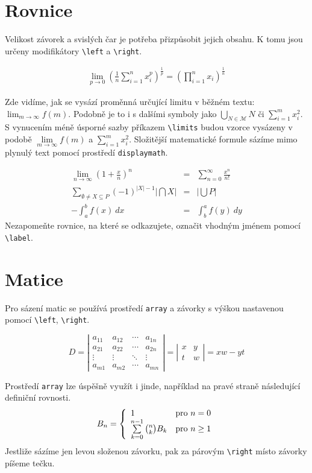 \documentclass[a4paper, 11pt, twocolumn]{article}
\theoremstyle{definition}
\theoremstyle{definition}
\begin{document}
\section{Rovnice}
Velikost závorek a svislých čar je potřeba přizpůsobit jejich obsahu.
K tomu jsou určeny modifikátory \texttt{\textbackslash left} a \texttt{\textbackslash right}.

\begin{eqnarray}
\lim_{p\to 0} \left(\frac{1}{n} \sum\limits _{i=1}^n x_i^p\right)^\frac{1}{p}=\left(\prod\limits _{i=1}^n x_i\right)^\frac{1}{n}
\end{eqnarray}

Zde vidíme, jak se vysází proměnná určující limitu v běžném textu: $\lim_{m\to\infty}f(m)$.
Podobně je to i s dalšími symboly jako $\bigcup_{N\in\mathcal{M}}N$ či $\sum_{i=1}^m x_i^2$.
S vynucením méně úsporné sazby příkazem \texttt{\textbackslash limits} budou vzorce vysázeny v podobě $\lim\limits_{m\to\infty}f(m)$ a $\sum\limits_{i=1}^m x_i^2$.
Složitější matematické formule sázíme mimo plynulý text pomocí prostředí \texttt{displaymath}.

\begin{eqnarray}
\lim_{n\to\infty}\left(1+\frac{x}{n}\right)^n&=&\sum\limits_{n=0}^\infty \frac{x^n}{n!}\\
\sum\limits_{\emptyset\neq X\subseteq P} (-1)^{|X|-1}\left|\bigcap X\right|&=&\left|\bigcup P\right|\\
\label{eq7}-\int_{a}^{b}f(x)\:dx&=&\int_{b}^{a}f(y)\:dy
\end{eqnarray}
Nezapomeňte rovnice, na které se odkazujete, označit vhodným jménem pomocí \texttt{\textbackslash label}.

\section{Matice}
Pro sázení matic se používá prostředí \texttt{array} a závorky s výškou nastavenou pomocí
\texttt{\textbackslash left}, \texttt{\textbackslash right}.

$$
D=\left|\begin{array}{cccc}
a_{11}&a_{12}&\cdots&a_{1n}\\
a_{21}&a_{22}&\cdots&a_{2n}\\
\vdots&\vdots&\ddots&\vdots\\
a_{m1}&a_{m2}&\cdots&a_{mn}
\end{array}\right|=\left|\begin{array}{cc}
x&y\\
t&w 
\end{array}\right|=xw-yt$$

Prostředí \texttt{array} lze úspěšně využít i jinde,
například na pravé straně následující definiční rovnosti.
$$B_n=\left\{\begin{array}{l l}
1& \text{pro } n=0  \\
\sum\limits_{k=0}^{n-1}\binom{n}{k}B_k& \text{pro } n\geq 1
\end{array}\right.$$
Jestliže sázíme jen levou složenou závorku, pak za párovým \texttt{\textbackslash right}
místo závorky píšeme tečku.
\end{document}
